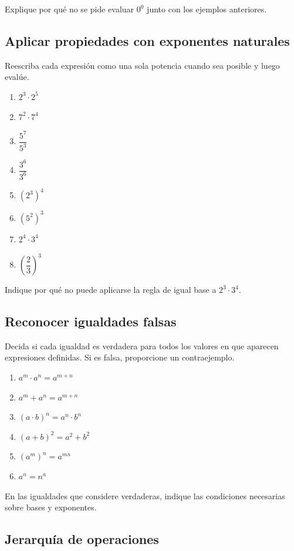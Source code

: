 Explique por qué no se pide evaluar \(0^0\) junto con los ejemplos anteriores.

\subsection*{Aplicar propiedades con exponentes naturales}

Reescriba cada expresión como una sola potencia cuando sea posible y luego evalúe.

\begin{enumerate}
\item \(2^3\cdot2^5\)
\item \(7^2\cdot7^4\)
\item \(\dfrac{5^7}{5^3}\)
\item \(\dfrac{3^6}{3^6}\)
\item \((2^3)^4\)
\item \((5^2)^3\)
\item \(2^4\cdot3^4\)
\item \(\left(\dfrac23\right)^3\)
\end{enumerate}

Indique por qué no puede aplicarse la regla de igual base a \(2^3\cdot3^4\).

\subsection*{Reconocer igualdades falsas}

Decida si cada igualdad es verdadera para todos los valores en que aparecen expresiones definidas. Si es falsa, proporcione un contraejemplo.

\begin{enumerate}
\item \(a^m\cdot a^n=a^{m+n}\)
\item \(a^m+a^n=a^{m+n}\)
\item \((a\cdot b)^n=a^n\cdot b^n\)
\item \((a+b)^2=a^2+b^2\)
\item \((a^m)^n=a^{mn}\)
\item \(a^n=n^a\)
\end{enumerate}

En las igualdades que considere verdaderas, indique las condiciones necesarias sobre bases y exponentes.

\subsection*{Jerarquía de operaciones}

